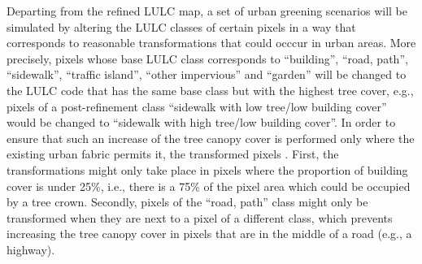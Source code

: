 \documentclass[10pt,letterpaper]{article}
\begin{document}
Departing from the refined LULC map, a set of urban greening scenarios will be simulated by altering the LULC classes of certain pixels in a way that corresponds to reasonable transformations that could occcur in urban areas.
More precisely, pixels whose base LULC class corresponds to ``building'', ``road, path'', ``sidewalk'', ``traffic island'', ``other impervious'' and ``garden'' will be changed to the LULC code that has the same base class but with the highest tree cover, e.g.,  pixels of a post-refinement class ``sidewalk with low tree/low building cover'' would be changed to ``sidewalk with high tree/low building cover''.
In order to ensure that such an increase of the tree canopy cover is performed only where the existing urban fabric permits it, the transformed pixels . First, the transformations might only take place in pixels where the proportion of building cover is under 25\%, i.e., there is a 75\% of the pixel area which could be occupied by a tree crown. Secondly, pixels of the ``road, path'' class might only be transformed when they are next to a pixel of a different class, which prevents increasing the tree canopy cover in pixels that are in the middle of a road (e.g., a highway).
\end{document}
